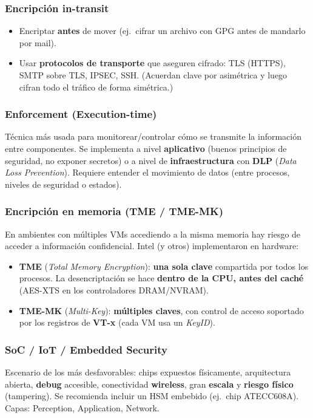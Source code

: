 \documentclass[../main.tex]{subfiles}
\begin{document}
\subsubsection{Encripción in-transit}
\begin{itemize}[nosep]
  \item Encriptar \textbf{antes} de mover (ej.\ cifrar un archivo con GPG antes de
        mandarlo por mail).
  \item Usar \textbf{protocolos de transporte} que aseguren cifrado: TLS (HTTPS),
        SMTP sobre TLS, IPSEC, SSH. (Acuerdan clave por asimétrica y luego cifran todo
        el tráfico de forma simétrica.)
\end{itemize}

\subsubsection{Enforcement (Execution-time)}
Técnica más usada para monitorear/controlar cómo se transmite la información entre
componentes. Se implementa a nivel \textbf{aplicativo} (buenos principios de seguridad,
no exponer secretos) o a nivel de \textbf{infraestructura} con \textbf{DLP} (\emph{Data
Loss Prevention}). Requiere entender el movimiento de datos (entre procesos, niveles de
seguridad o estados).

\subsubsection{Encripción en memoria (TME / TME-MK)}
En ambientes con múltiples VMs accediendo a la misma memoria hay riesgo de acceder a
información confidencial. Intel (y otros) implementaron en hardware:
\begin{itemize}[nosep]
  \item \textbf{TME} (\emph{Total Memory Encryption}): \textbf{una sola clave} compartida
        por todos los procesos. La desencriptación se hace \textbf{dentro de la CPU,
        antes del caché} (AES-XTS en los controladores DRAM/NVRAM).
  \item \textbf{TME-MK} (\emph{Multi-Key}): \textbf{múltiples claves}, con control de
        acceso soportado por los registros de \textbf{VT-x} (cada VM usa un \emph{KeyID}).
\end{itemize}

\subsubsection{SoC / IoT / Embedded Security}
Escenario de los más desfavorables: chips expuestos físicamente, arquitectura abierta,
\textbf{debug} accesible, conectividad \textbf{wireless}, gran \textbf{escala} y
\textbf{riesgo físico} (tampering). Se recomienda incluir un HSM embebido (ej.\ chip
ATECC608A). Capas: Perception, Application, Network.
\end{document}
